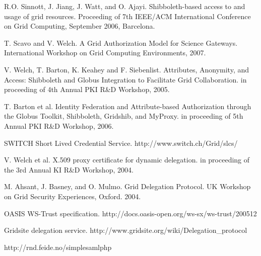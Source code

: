 \documentclass[conference]{IEEEtran}
\begin{document}
\begin{thebibliography}{99}
R.O. Sinnott, J. Jiang, J. Watt, and O. Ajayi. Shibboleth-based access to and 
usage of grid resources. Proceeding of 7th IEEE/ACM International Conference on 
Grid Computing, September 2006, Barcelona.

T. Scavo and V. Welch. A Grid Authorization Model for Science Gateways. International 
Workshop on Grid Computing Environments, 2007.

V. Welch, T. Barton, K. Keahey and F. Siebenlist. Attributes, Anonymity, and 
Access: Shibboleth and Globus Integration to Facilitate Grid Collaboration. in 
proceeding of 4th Annual PKI R\&D Workshop, 2005.

T. Barton et al. Identity Federation and Attribute-based Authorization 
through the Globus Toolkit, Shibboleth, Gridshib, and MyProxy. in proceeding 
of 5th Annual PKI R\&D Workshop, 2006.

SWITCH Short Lived Credential Service. http://www.switch.ch/Grid/slcs/

V. Welch et al. X.509 proxy certificate for dynamic delegation. in proceeding 
of the 3rd Annual KI R\&D Workshop, 2004.

M. Ahsant, J. Basney, and O. Mulmo. Grid Delegation Protocol. UK Workshop on 
Grid Security Experiences, Oxford. 2004.

OASIS WS-Trust specification. http://docs.oasis-open.org/ws-sx/ws-trust/200512

Gridsite delegation service. http://www.gridsite.org/wiki/Delegation\_protocol

http://rnd.feide.no/simplesamlphp

\end{thebibliography}
\end{document}
